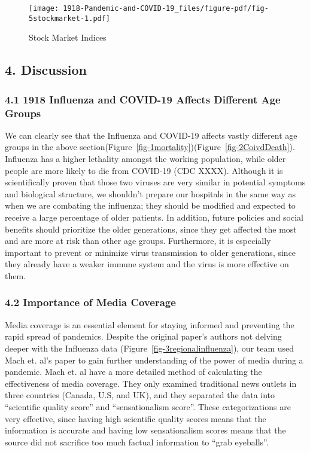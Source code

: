 \documentclass[
]{article}
\begin{document}
\begin{figure}

{\centering \texttt{[image: 1918-Pandemic-and-COVID-19\_files/figure-pdf/fig-5stockmarket-1.pdf]}

}

\caption{\label{fig-5stockmarket}Stock Market Indices}

\end{figure}

\hypertarget{discussion}{%
\subsection{4. Discussion}\label{discussion}}

\hypertarget{influenza-and-covid-19-affects-different-age-groups}{%
\subsubsection{4.1 1918 Influenza and COVID-19 Affects Different Age
Groups}\label{influenza-and-covid-19-affects-different-age-groups}}

We can clearly see that the Influenza and COVID-19 affects vastly
different age groups in the above
section(Figure~\ref{fig-1mortality})(Figure~\ref{fig-2CoivdDeath}).
Influenza has a higher lethality amongst the working population, while
older people are more likely to die from COVID-19 (CDC XXXX). Although
it is scientifically proven that those two viruses are very similar in
potential symptoms and biological structure, we shouldn't prepare our
hospitals in the same way as when we are combating the influenza; they
should be modified and expected to receive a large percentage of older
patients. In addition, future policies and social benefits should
prioritize the older generations, since they get affected the most and
are more at risk than other age groups. Furthermore, it is especially
important to prevent or minimize virus transmission to older
generations, since they already have a weaker immune system and the
virus is more effective on them.

\hypertarget{importance-of-media-coverage}{%
\subsubsection{4.2 Importance of Media
Coverage}\label{importance-of-media-coverage}}

Media coverage is an essential element for staying informed and
preventing the rapid spread of pandemics. Despite the original paper's
authors not delving deeper with the Influenza data
(Figure~\ref{fig-3regionalinfluenza}), our team used Mach et. al's paper
to gain further understanding of the power of media during a pandemic.
Mach et. al have a more detailed method of calculating the effectiveness
of media coverage. They only examined traditional news outlets in three
countries (Canada, U.S, and UK), and they separated the data into
``scientific quality score'' and ``sensationalism score''. These
categorizations are very effective, since having high scientific quality
scores means that the information is accurate and having low
sensationalism scores means that the source did not sacrifice too much
factual information to ``grab eyeballs''.
\end{document}
